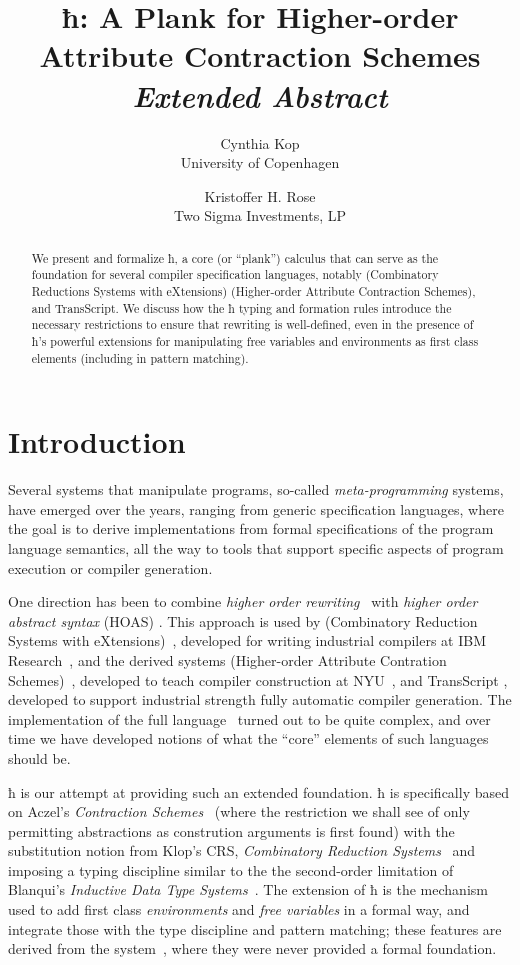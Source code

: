 \documentclass[letterpaper,10pt]{proc}
\title{ ħ: A Plank for Higher-order Attribute Contraction Schemes \\ \emph{Extended Abstract} }
\author{%
  Cynthia Kop \\
  University of Copenhagen
  \and
  Kristoffer H. Rose \\
  Two Sigma Investments, LP
}
\begin{document}
\maketitle

\begin{abstract}\noindent
  We present and formalize ħ, a core (or ``plank'') calculus that can serve as the foundation
  for several compiler specification languages, notably \CRSX (Combinatory Reductions Systems with
  eXtensions) \HAX (Higher-order Attribute Contraction Schemes), and \textsf{TransScript}.
  We discuss how the ħ typing and formation rules introduce the necessary restrictions to
  ensure that rewriting is well-defined, even in the presence of ħ's powerful extensions for
  manipulating free variables and environments as first class elements (including in pattern
  matching).
\end{abstract}


\section{Introduction}\label{sec:intro}

Several systems that manipulate programs, so-called \emph{meta-programming} systems, have emerged
over the years, ranging from generic specification languages, where the goal is to derive
implementations from formal specifications of the program language semantics, all the way to tools
that support specific aspects of program execution or compiler generation.

One direction has been to combine \emph{higher order rewriting}~\cite{Jouannaud:klop2005} with
\emph{higher order abstract syntax} (HOAS) \cite{PfenningElliot:pldi1988}. This approach is used by
\CRSX (Combinatory Reduction Systems with eXtensions)~\cite{Rose:1996}, developed for writing
industrial compilers at IBM Research~\cite{Rose:rta2011}, and the derived systems \HAX (Higher-order
Attribute Contration Schemes)~\cite{Rose:ts2015}, developed to teach compiler construction at
NYU~\cite{RoseRose:cims2015}, and \textsf{TransScript} \cite{}, developed to support industrial
strength fully automatic compiler generation.  The implementation of the full \CRSX
language~\cite{crsx} turned out to be quite complex, and over time we have developed notions of what
the ``core'' elements of such languages should be.

ħ is our attempt at providing such an extended foundation.  ħ is specifically based on Aczel's
\emph{Contraction Schemes}~\cite{Aczel:1978} (where the restriction we shall see of only permitting
abstractions as constrution arguments is first found) with the substitution notion from Klop's CRS,
\emph{Combinatory Reduction Systems}~\cite{Klop+:tcs1993} and imposing a typing discipline similar
to the the second-order limitation of Blanqui's \emph{Inductive Data Type
  Systems}~\cite{BlanquiJouannaudOkada:tcs2002}. The extension of ħ is the mechanism used to add
first class \emph{environments} and \emph{free variables} in a formal way, and integrate those with
the type discipline and pattern matching; these features are derived from the \CRSX
system~\cite{Rose:rta2011}, where they were never provided a formal foundation.
\end{document}
